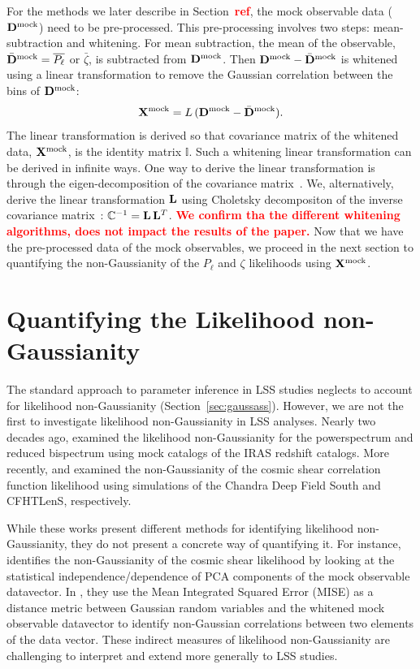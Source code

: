 \documentclass[12pt, letterpaper, preprint]{aastex}
\newcommand{\beq}{\begin{equation}}
\newcommand{\eeq}{\end{equation}}
\newcommand{\todo}[1]{{\bf \textcolor{red}{#1}}}
\newcommand{\Dmock}{{\bf D}^\mathrm{mock}}
\newcommand{\Xmock}{{\bf X}^\mathrm{mock}}
\begin{document}
For the methods we later describe in Section~\todo{ref}, the mock 
observable data ($\Dmock$) need to be pre-processed. This pre-processing
involves two steps: mean-subtraction and whitening. For mean subtraction, 
the mean of the observable, $\bar{\bf D}^\mathrm{mock} = \overline{P_\ell}$ or 
$\bar{\zeta}$, is subtracted from $\Dmock$. Then $\Dmock - \bar{\bf D}^\mathrm{mock}$ 
is whitened using a linear transformation to remove the Gaussian correlation
between the bins of $\Dmock$: 
\beq
\Xmock = L\,(\Dmock - \bar{\bf D}^\mathrm{mock}). 
\eeq
The linear transformation is derived so that covariance matrix of the whitened 
data, $\Xmock$, is the identity matrix $\mathbb{I}$. Such a whitening linear 
transformation can be derived in infinite ways. 
One way to derive the linear transformation is through the eigen-decomposition
of the covariance matrix~\citep[\emph{e.g.}][]{hartlap2009, sellentin2017}. We, alternatively, 
derive the linear transformation ${\bf L}$ using Choletsky decompositon of the 
inverse covariance matrix~\citep{Press:1992:NRC:148286}: 
$\mathbb{C}^{-1} = {\bf L}\,{\bf L}^T$. \todo{We confirm tha the different 
whitening algorithms, does not impact the results of the paper.}
Now that we have the pre-processed data of the mock observables, 
we proceed in the next section to quantifying the non-Gaussianity of the 
$P_\ell$ and $\zeta$ likelihoods using $\Xmock$. 


\section{Quantifying the Likelihood non-Gaussianity} \label{sec:div}
The standard approach to parameter inference in LSS studies neglects
to account for likelihood non-Gaussianity (Section~\ref{sec:gaussass}). 
However, we are not the first to investigate likelihood non-Gaussianity 
in LSS analyses. Nearly two decades ago, \cite{scoccimarro2000} examined 
the likelihood non-Gaussianity for the powerspectrum and reduced bispectrum 
using mock catalogs of the IRAS redshift catalogs. More recently, 
\cite{hartlap2009} and \cite{sellentin2017} examined the non-Gaussianity 
of the cosmic shear correlation function likelihood using simulations of 
the Chandra Deep Field South and CFHTLenS, respectively. 

While these works present different methods for identifying 
likelihood non-Gaussianity, they do not present a concrete way of 
quantifying it. For instance, \cite{hartlap2009} identifies the
non-Gaussianity of the cosmic shear likelihood by looking at the
statistical independence/dependence of PCA components of the mock 
observable datavector. In \cite{sellentin2017}, they use the Mean
Integrated Squared Error (MISE) as a distance metric between 
Gaussian random variables and the whitened mock observable 
datavector to identify non-Gaussian correlations between two elements 
of the data vector. These indirect measures of likelihood non-Gaussianity 
are challenging to interpret and extend more generally to LSS studies. 
\end{document}
